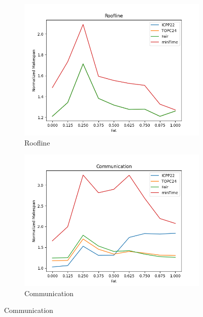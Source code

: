 \documentclass{article}
\begin{document}
\begin{figure}[htbp]
\centering
\begin{subfigure}[b]{0.32\textwidth}\includegraphics[width=\textwidth]{Results/Fat/Fat_Roofline}\caption{Roofline}\label{fig:lines_figures_Fat_Roofline}\end{subfigure}
\hfill
\begin{subfigure}[b]{0.32\textwidth}\includegraphics[width=\textwidth]{Results/Fat/Fat_Communication}\caption{Communication}\label{fig:lines_figures_Fat_Communication}\end{subfigure}
\hfill

\end{figure}
\end{document}
